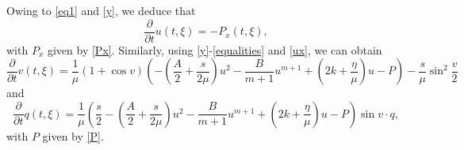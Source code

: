 \documentclass[10pt]{article}
\numberwithin{equation}{section}
\begin{document}
	Owing to \eqref{eq1} and \eqref{y}, we deduce that
	\begin{equation*}
		\frac{\partial}{\partial t}u(t,\xi)=-P_x(t,\xi),
	\end{equation*}
	with $P_x$ given by \eqref{Px}. Similarly, using \eqref{y}-\eqref{equalities} and \eqref{ux}, we can obtain
	\begin{equation*}
		\frac{\partial}{\partial t}v(t,\xi)=\frac{1}{\mu}(1+\cos v)\left(-\left(\frac A2+\frac{s}{2\mu}\right)u^2-\frac{B}{m+1}u^{m+1}+\left(2k+\frac{\eta}{\mu}\right)u-P\right)-\frac{s}{\mu}\sin^2\frac{v}{2}
	\end{equation*}
	and
	\begin{equation*}
		\frac{\partial}{\partial t}q(t,\xi)=\frac{1}{\mu}\left(\frac{s}{2}-\left(\frac A2+\frac{s}{2\mu}\right)u^2-\frac{B}{m+1}u^{m+1}+\left(2k+\frac{\eta}{\mu}\right)u-P\right)\sin v\cdot q,
	\end{equation*}
	with $P$ given by \eqref{P}.
	
\end{document}
